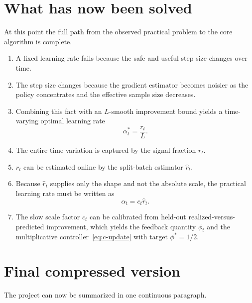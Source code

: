 \documentclass[11pt]{article}
\begin{document}
\section{What has now been solved}

At this point the full path from the observed practical problem to the core algorithm is complete.
\begin{enumerate}
    \item A fixed learning rate fails because the safe and useful step size changes over time.
    \item The step size changes because the gradient estimator becomes noisier as the policy concentrates and the effective sample size decreases.
    \item Combining this fact with an $L$-smooth improvement bound yields a time-varying optimal learning rate
    \[
    \alpha_t^* = \frac{r_t}{L}.
    \]
    \item The entire time variation is captured by the signal fraction $r_t$.
    \item $r_t$ can be estimated online by the split-batch estimator $\hat r_t$.
    \item Because $\hat r_t$ supplies only the shape and not the absolute scale, the practical learning rate must be written as
    \[
    \alpha_t = c_t\hat r_t.
    \]
    \item The slow scale factor $c_t$ can be calibrated from held-out realized-versus-predicted improvement, which yields the feedback quantity $\phi_t$ and the multiplicative controller~\eqref{eq:c-update} with target $\phi^*=1/2$.
\end{enumerate}

\section{Final compressed version}

The project can now be summarized in one continuous paragraph.
\end{document}
